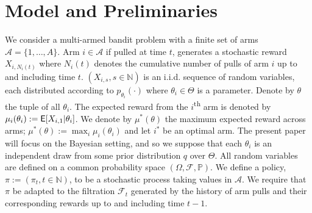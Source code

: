 \section{Model and Preliminaries} \label{sec:model_and_prelim}
We consider a multi-armed bandit problem with a finite set of arms  $\mathcal{A} = \{1,\ldots,A\}$. Arm $i \in \mathcal{A}$ if pulled at time $t$, generates a stochastic reward $X_{i,N_i(t)}$ where $N_i(t)$ denotes the cumulative number of pulls of arm $i$ up to and including time $t$. $(X_{i,s}, s \in \mathbb{N})$ is an i.i.d. sequence of random variables, each distributed according to $p_{\theta_i}(\cdot)$ where $\theta_i \in \Theta$ is a parameter. Denote by $\theta$ the tuple of all $\theta_i$. The expected reward from the $i$\textsuperscript{th} arm is denoted by $\mu_i(\theta_i) := \mathsf{E}[X_{i,1} | \theta_i]$. We denote by $\mu^*(\theta)$ the maximum expected reward across arms;  $\mu^*(\theta) := \max_i \mu_i(\theta_i)$ and let $i^*$ be an optimal arm. The present paper will focus on the Bayesian setting, and so we suppose that each $\theta_i$ is an independent draw from some prior distribution $q$ over $\Theta$. All random variables are defined on a common probability space $(\Omega, \mathcal{F}, \mathbb{P})$. We define a policy, $\pi := (\pi_t, t \in \mathbb{N})$, to be a stochastic process taking values in $\mathcal{A}$. We require that $\pi$ be adapted to the filtration $\mathcal{F}_t$ generated by the history of arm pulls and their corresponding rewards up to and including time $t-1$.

